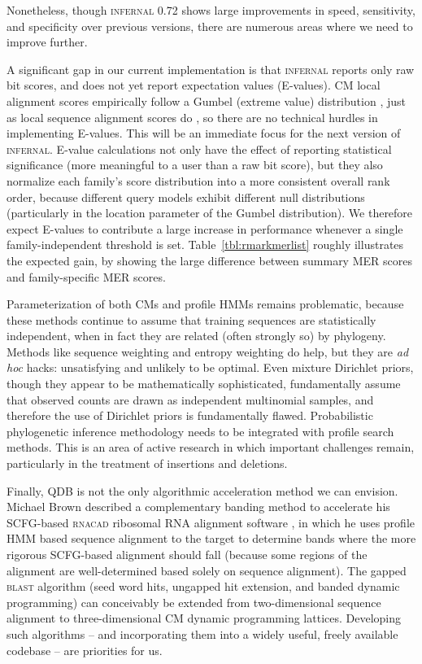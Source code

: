 \documentclass[11pt]{article}
\begin{document}
Nonetheless, though \textsc{infernal} 0.72 shows large improvements in
speed, sensitivity, and specificity over previous versions, there are
numerous areas where we need to improve further. 

A significant gap in our current implementation is that
\textsc{infernal} reports only raw bit scores, and does not yet report
expectation values (E-values). CM local alignment scores empirically
follow a Gumbel (extreme value) distribution \cite{KleinEddy03}, just
as local sequence alignment scores do \cite{KarlinAltschul93}, so
there are no technical hurdles in implementing E-values. This will be
an immediate focus for the next version of \textsc{infernal}.  E-value
calculations not only have the effect of reporting statistical
significance (more meaningful to a user than a raw bit score), but
they also normalize each family's score distribution into a more
consistent overall rank order, because different query models exhibit
different null distributions (particularly in the location parameter
of the Gumbel distribution). We therefore expect E-values to
contribute a large increase in performance whenever a single
family-independent threshold is set. Table~\ref{tbl:rmarkmerlist}
roughly illustrates the expected gain, by showing the large difference
between summary MER scores and family-specific MER scores.

Parameterization of both CMs and profile HMMs remains problematic,
because these methods continue to assume that training sequences are
statistically independent, when in fact they are related (often
strongly so) by phylogeny. Methods like sequence weighting and entropy
weighting do help, but they are \emph{ad hoc} hacks: unsatisfying and
unlikely to be optimal. Even mixture Dirichlet priors, though they
appear to be mathematically sophisticated, fundamentally assume that
observed counts are drawn as independent multinomial samples, and
therefore the use of Dirichlet priors is fundamentally flawed.
Probabilistic phylogenetic inference methodology needs to be
integrated with profile search methods. This is an area of active
research \cite{Holmes04, Holmes05b, Rivas05} in which important
challenges remain, particularly in the treatment of insertions and
deletions.

Finally, QDB is not the only algorithmic acceleration method we can
envision.  Michael Brown described a complementary banding method to
accelerate his SCFG-based \textsc{rnacad} ribosomal RNA alignment
software \cite{Brown00}, in which he uses profile HMM based sequence
alignment to the target to determine bands where the more rigorous
SCFG-based alignment should fall (because some regions of the
alignment are well-determined based solely on sequence alignment). The
gapped \textsc{blast} algorithm (seed word hits, ungapped hit extension, and
banded dynamic programming) can conceivably be extended from
two-dimensional sequence alignment to three-dimensional CM dynamic
programming lattices. Developing such algorithms -- and incorporating
them into a widely useful, freely available codebase -- are priorities
for us.
\end{document}
